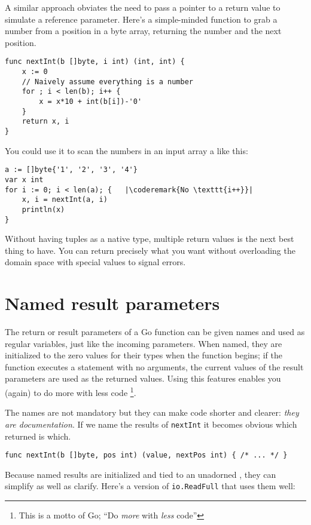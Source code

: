 A similar approach obviates the need to pass a pointer to a return value to
simulate a reference parameter. Here's a simple-minded function to grab a
number from a position in a byte array, returning the number and the next
position.
\begin{lstlisting}
func nextInt(b []byte, i int) (int, int) {
    x := 0
    // Naively assume everything is a number
    for ; i < len(b); i++ {
        x = x*10 + int(b[i])-'0'
    }
    return x, i
}
\end{lstlisting}
You could use it to scan the numbers in an input array a like this:
\begin{lstlisting}
a := []byte{'1', '2', '3', '4'}
var x int
for i := 0; i < len(a); {	|\coderemark{No \texttt{i++}}|
    x, i = nextInt(a, i)
    println(x)
}
\end{lstlisting}
Without having tuples as a native type, multiple return values is the next
best thing to have. You can return precisely what you want without
overloading the domain space with special values to signal errors.

\section{Named result parameters}
\label{sec:named result parameters}
The return or result parameters of a Go function can be given names and used
as regular variables, just like the incoming parameters. When named, they are
initialized to the zero values for their types when the function begins; if the
function executes a  statement with no arguments, the current values of
the result parameters are used as the returned values. Using this
features enables you (again) to do more with less code \footnote{This is
a motto of Go; ``Do \emph{more} with \emph{less} code''}.

The names are not mandatory but they can make code shorter and clearer:
\emph{they are documentation}. 
If we name the results of \lstinline{nextInt} it becomes obvious which
returned  is which.

\begin{lstlisting}
func nextInt(b []byte, pos int) (value, nextPos int) { /* ... */ }
\end{lstlisting}
Because named results are initialized and tied to an unadorned
,
they can simplify as well as clarify. Here's a version of
\lstinline{io.ReadFull} that uses them well:

